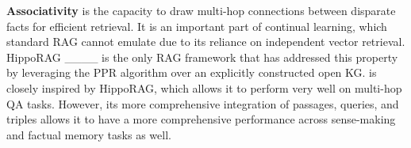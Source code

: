 \noindent \textbf{Associativity} is the capacity to draw multi-hop connections between disparate facts for efficient retrieval. It is an important part of continual learning, which standard RAG cannot emulate due to its reliance on independent vector retrieval. HippoRAG ____ is the only RAG framework that has addressed this property by leveraging the PPR algorithm over an explicitly constructed open KG. \ours is closely inspired by HippoRAG, which allows it to perform very well on multi-hop QA tasks. However, its more comprehensive integration of passages, queries, and triples allows it to have a more comprehensive performance across sense-making and factual memory tasks as well.